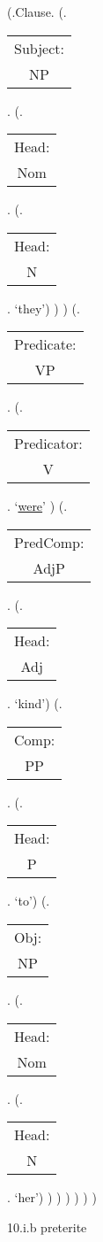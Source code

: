 \documentclass[12pt,letterpaper]{article}
\begin{document}
\begin{figure}
	\begin{center}
		\begin{parsetree}
			(.Clause.
			(.\begin{tabular}{c}Subject:\\NP\end{tabular}.  
			(.\begin{tabular}{c}Head:\\Nom\end{tabular}.
			(.\begin{tabular}{c}Head:\\N\end{tabular}. `they')
			)
			)
			(.\begin{tabular}{c}Predicate:\\VP\end{tabular}.
			(.\begin{tabular}{c}Predicator:\\V\end{tabular}. `\underline{were}' )
			(.\begin{tabular}{c}PredComp:\\AdjP\end{tabular}.
			(.\begin{tabular}{c}Head:\\Adj\end{tabular}. `kind')
			(.\begin{tabular}{c}Comp:\\PP\end{tabular}.
			(.\begin{tabular}{c}Head:\\P\end{tabular}. `to')
			(.\begin{tabular}{c}Obj:\\NP\end{tabular}. 
			(.\begin{tabular}{c}Head:\\Nom\end{tabular}. 
			(.\begin{tabular}{c}Head:\\N\end{tabular}. `her')
			)
			)
			)
			)
			)
			)
			
			
		\end{parsetree}
		\hfill \break \hfill \break
		10.i.b preterite
	\end{center}
\end{figure}
\end{document}
